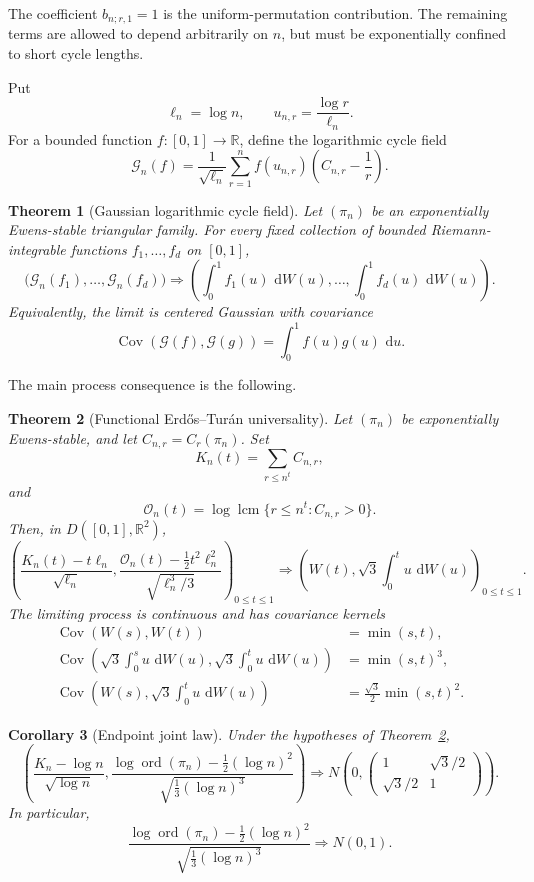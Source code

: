 \documentclass[11pt]{article}
\newtheorem{theorem}{Theorem}[section]
\newtheorem{corollary}[theorem]{Corollary}
\theoremstyle{definition}
\theoremstyle{remark}
\newcommand{\Cov}{\operatorname{Cov}}
\newcommand{\dd}{\,\mathrm d}
\newcommand{\ord}{\operatorname{ord}}
\newcommand{\lcm}{\operatorname{lcm}}
\newcommand{\cO}{\mathcal O}
\newcommand{\cG}{\mathcal G}
\newcommand{\R}{\mathbb R}
\begin{document}
The coefficient $b_{n;r,1}=1$ is the uniform-permutation contribution.
The remaining terms are allowed to depend arbitrarily on $n$, but must be
exponentially confined to short cycle lengths.

Put
\[
 \ell_n=\log n,
 \qquad
 u_{n,r}=\frac{\log r}{\ell_n}.
\]
For a bounded function $f:[0,1]\to\R$, define the logarithmic cycle field
\[
 \cG_n(f)
 =
 \frac1{\sqrt{\ell_n}}
 \sum_{r=1}^n
 f(u_{n,r})\left(C_{n,r}-\frac1r\right).
\]

\begin{theorem}[Gaussian logarithmic cycle field]\label{thm:cycle-field}
Let $(\pi_n)$ be an exponentially Ewens-stable triangular family.  For
every fixed collection of bounded Riemann-integrable functions
$f_1,\ldots,f_d$ on $[0,1]$,
\[
 \bigl(\cG_n(f_1),\ldots,\cG_n(f_d)\bigr)
 \Rightarrow
 \left(
 \int_0^1f_1(u)\,\dd W(u),\ldots,
 \int_0^1f_d(u)\,\dd W(u)
 \right).
\]
Equivalently, the limit is centered Gaussian with covariance
\[
 \Cov(\cG(f),\cG(g))=\int_0^1f(u)g(u)\,\dd u.
\]
\end{theorem}

The main process consequence is the following.

\begin{theorem}[Functional Erd\H{o}s--Tur\'an universality]
\label{thm:general-functional}
Let $(\pi_n)$ be exponentially Ewens-stable, and let $C_{n,r}=C_r(\pi_n)$.
Set
\[
 K_n(t)=\sum_{r\le n^t}C_{n,r},
\]
and
\[
 \cO_n(t)=\log\lcm\{r\le n^t:C_{n,r}>0\}.
\]
Then, in $D([0,1],\R^2)$,
\begin{equation}\label{eq:functional-main}
 \left(
 \frac{K_n(t)-t\ell_n}{\sqrt{\ell_n}},
 \frac{\cO_n(t)-\frac12t^2\ell_n^2}
      {\sqrt{\ell_n^3/3}}
 \right)_{0\le t\le1}
 \Rightarrow
 \left(
 W(t),\sqrt3\int_0^t u\,\dd W(u)
 \right)_{0\le t\le1}.
\end{equation}
The limiting process is continuous and has covariance kernels
\begin{align*}
 \Cov(W(s),W(t))&=\min(s,t),\\
 \Cov\left(
 \sqrt3\int_0^s u\,\dd W(u),
 \sqrt3\int_0^t u\,\dd W(u)
 \right)&=\min(s,t)^3,\\
 \Cov\left(
 W(s),\sqrt3\int_0^t u\,\dd W(u)
 \right)&=\frac{\sqrt3}{2}\min(s,t)^2.
\end{align*}
\end{theorem}

\begin{corollary}[Endpoint joint law]\label{cor:endpoint-joint}
Under the hypotheses of Theorem~\ref{thm:general-functional},
\[
 \left(
 \frac{K_n-\log n}{\sqrt{\log n}},
 \frac{\log\ord(\pi_n)-\frac12(\log n)^2}
      {\sqrt{\frac13(\log n)^3}}
 \right)
 \Rightarrow
 N\!\left(
 0,
 \begin{pmatrix}
 1&\sqrt3/2\\
 \sqrt3/2&1
 \end{pmatrix}
 \right).
\]
In particular,
\[
 \frac{\log\ord(\pi_n)-\frac12(\log n)^2}
 {\sqrt{\frac13(\log n)^3}}
 \Rightarrow N(0,1).
\]
\end{corollary}
\end{document}
